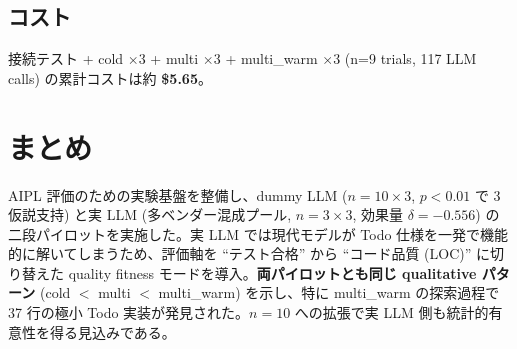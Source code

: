 \documentclass[a4paper,11pt]{ltjsarticle}
\begin{document}
\subsection{コスト}

接続テスト + cold $\times 3$ + multi $\times 3$ + multi\_warm $\times 3$ (n=9 trials, 117 LLM calls) の累計コストは約 \textbf{\$5.65}。

\section{まとめ}

AIPL 評価のための実験基盤を整備し、dummy LLM ($n=10 \times 3$, $p<0.01$ で 3 仮説支持) と実 LLM (多ベンダー混成プール, $n=3 \times 3$, 効果量 $\delta=-0.556$) の二段パイロットを実施した。実 LLM では現代モデルが Todo 仕様を一発で機能的に解いてしまうため、評価軸を ``テスト合格'' から ``コード品質 (LOC)'' に切り替えた quality fitness モードを導入。\textbf{両パイロットとも同じ qualitative パターン} (cold $<$ multi $<$ multi\_warm) を示し、特に multi\_warm の探索過程で 37 行の極小 Todo 実装が発見された。$n=10$ への拡張で実 LLM 側も統計的有意性を得る見込みである。
\end{document}
